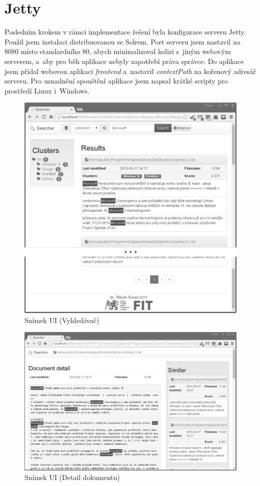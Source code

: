 \section{Jetty}
Posledním krokem v rámci implementace řešení byla konfigurace serveru Jetty. Použil jsem instalaci distribuovanou se Solrem. Port serveru jsem nastavil na 8080 místo standardního 80, abych minimalizoval kolizi s~jiným webovým serverem, a~aby pro běh aplikace nebyly zapotřebí práva správce. Do aplikace jsem přidal webovou aplikaci \emph{frontend} a~nastavil \emph{contextPath} na kořenový adresář serveru. Pro usnadnění spouštění aplikace jsem napsal krátké scripty pro prostředí Linux i~Windows.

\begin{figure}[h]
\begin{center}
\includegraphics[width=13cm]{ScreenSearcher}
\caption{Snímek UI (Vyhledávač)}
\label{fig:ScreenSearcher}
\end{center}
\end{figure}

\begin{figure}[h]
\begin{center}
\includegraphics[width=13cm]{ScreenDetail}
\caption{Snímek UI (Detail dokumentu)}
\label{fig:ScreenDetail}
\end{center}
\end{figure}
